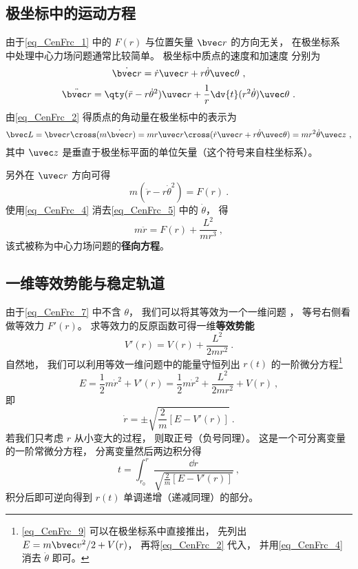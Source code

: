 \subsection{极坐标中的运动方程}
由于\autoref{eq_CenFrc_1} 中的 $F(r)$ 与位置矢量 $\bvec r$ 的方向无关， 在极坐标系 中处理中心力场问题通常比较简单。 极坐标中质点的速度和加速度 分别为
\begin{equation}\label{eq_CenFrc_2}
\dot{\bvec r} = \dot r \uvec r + r\dot\theta\uvec\theta~,
\end{equation}
\begin{equation}\label{eq_CenFrc_3}
\ddot{\bvec r} = \qty(\ddot{r} - r \dot\theta^2)\uvec r + \frac 1r \dv{t} (r^2\dot\theta)\uvec \theta~.
\end{equation}
由\autoref{eq_CenFrc_2} 得质点的角动量在极坐标中的表示为
\begin{equation}\label{eq_CenFrc_4}
\bvec L = \bvec r \cross (m \dot{\bvec r})
= mr \uvec r \cross (\dot r \uvec r + r\dot\theta \uvec\theta)
= mr^2\dot \theta \uvec z~,
\end{equation}
其中 $\uvec z$ 是垂直于极坐标平面的单位矢量（这个符号来自柱坐标系）。 

另外在 $\uvec r$ 方向可得
\begin{equation}\label{eq_CenFrc_5}
m(\ddot{r} - r \dot\theta^2) = F(r)~.
\end{equation}
使用\autoref{eq_CenFrc_4} 消去\autoref{eq_CenFrc_5} 中的 $\dot\theta$， 得
\begin{equation}\label{eq_CenFrc_7}
m\ddot r = F(r) + \frac{L^2}{mr^3}~,
\end{equation}
该式被称为中心力场问题的\textbf{径向方程}。

\subsection{一维等效势能与稳定轨道}
由于\autoref{eq_CenFrc_7} 中不含 $\theta$， 我们可以将其等效为一个一维问题 %
， 等号右侧看做等效力 $F'(r)$。 求等效力的反原函数可得一维\textbf{等效势能}
\begin{equation}\label{eq_CenFrc_6}
V'(r) = V(r) + \frac{L^2}{2mr^2}~.
\end{equation}
自然地， 我们可以利用等效一维问题中的能量守恒列出 $r(t)$ 的一阶微分方程\footnote{\autoref{eq_CenFrc_9} 可以在极坐标系中直接推出， 先列出 $E = m\bvec v^2/2 + V(r)$， 再将\autoref{eq_CenFrc_2} 代入， 并用\autoref{eq_CenFrc_4} 消去 $\dot\theta$ 即可。}
\begin{equation}\label{eq_CenFrc_9}
E = \frac 12 m\dot r^2 + V'(r) = \frac 12 m\dot r^2 + \frac{L^2}{2mr^2} + V(r)~,
\end{equation}
即
\begin{equation}\label{eq_CenFrc_10}
\dot r = \pm\sqrt{\frac 2m [E - V'(r)]}~.
\end{equation}
若我们只考虑 $r$ 从小变大的过程， 则取正号（负号同理）。 这是一个可分离变量的一阶常微分方程， %
分离变量然后两边积分得
\begin{equation}\label{eq_CenFrc_8}
t = \int_{r_0}^{r} \frac{\dd{r}}{\sqrt{\frac 2m [E - V'(r)]}}~,
\end{equation}
积分后即可逆向得到 $r(t)$ 单调递增（递减同理）的部分。

